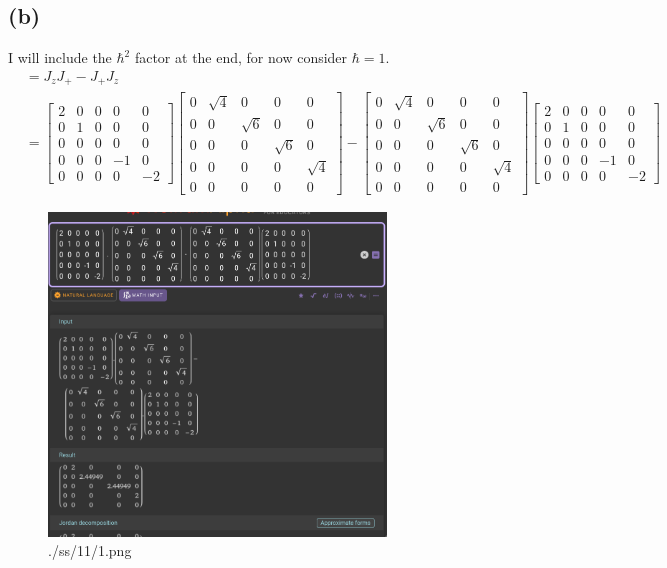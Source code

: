 \documentclass[letter, 10pts]{article}
\newcommand{\hb}{\hbar}
\begin{document}
\subsection*{(b)} 
I will include the $\hb^2$ factor at the end, for now consider $\hb = 1$. 
\begin{align*}
	[J_z , J_+] &= J_z J_+ - J_+ J_z  \\ 
	&= 
\begin{bmatrix}
2 & 0 & 0 & 0 & 0 \\
0 & 1 & 0 & 0 & 0 \\
0 & 0 & 0 & 0 & 0 \\
0 & 0 & 0 & -1 & 0 \\
0 & 0 & 0 & 0 & -2
\end{bmatrix} 
\begin{bmatrix}
0 &  \sqrt{4} & 0 & 0 & 0 \\
0 & 0 & \sqrt{6} & 0 & 0 \\
0 & 0 & 0 & \sqrt{6} & 0 \\
0 & 0 & 0 & 0 & \sqrt{4} \\
0 & 0 & 0 & 0 & 0
\end{bmatrix} 
- 
\begin{bmatrix}
0 &  \sqrt{4} & 0 & 0 & 0 \\
0 & 0 & \sqrt{6} & 0 & 0 \\
0 & 0 & 0 & \sqrt{6} & 0 \\
0 & 0 & 0 & 0 & \sqrt{4} \\
0 & 0 & 0 & 0 & 0
\end{bmatrix} 
\begin{bmatrix}
2 & 0 & 0 & 0 & 0 \\
0 & 1 & 0 & 0 & 0 \\
0 & 0 & 0 & 0 & 0 \\
0 & 0 & 0 & -1 & 0 \\
0 & 0 & 0 & 0 & -2
\end{bmatrix} 
\end{align*}
\begin{figure}[H]
	\centering
	\includegraphics[width=0.8\textwidth]{./ss/11/1.png}
	\caption{./ss/11/1.png}
	\label{fig:-ss-11-1-png}
\end{figure}
\end{document}
